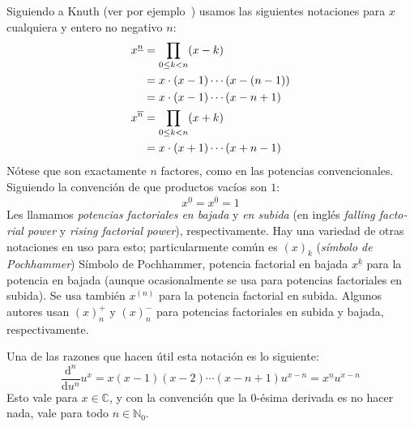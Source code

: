   Siguiendo a Knuth%
  (ver por ejemplo~\cite{graham94:_concr_mathem})
  usamos las siguientes notaciones para \(x\) cualquiera
  y entero no negativo \(n\):
  \begin{align}
    \label{eq:def-factorial-desciende}
    x^{\underline{n}}
      &= \prod_{0 \le k < n} (x - k) \\
      &= x \cdot (x - 1) \dotsm (x - (n - 1)) \notag \\
      &= x \cdot (x - 1) \dotsm (x - n + 1) \notag \\
    \label{eq:def-factorial-asciende}
    x^{\overline{n}}
      &= \prod_{0 \le k < n} (x + k) \\
      &= x \cdot (x + 1) \dotsm (x + n - 1) \notag
  \end{align}
  Nótese que
  son exactamente \(n\) factores,
  como en las potencias convencionales.
  Siguiendo la convención de que productos vacíos son \(1\):
  \begin{equation}
    \label{eq:potencias-factoriales-0}
    x^{\underline{0}} = x^{\overline{0}} = 1
  \end{equation}
  Les llamamos \emph{potencias factoriales en bajada}
  y \emph{en subida}
  (en inglés
    \emph{\foreignlanguage{english}{falling factorial power}}
   y \emph{\foreignlanguage{english}{rising factorial power}}),
  respectivamente.
  Hay una variedad de otras notaciones en uso para esto;
  particularmente común es \((x)_k\)
  (\emph{símbolo de Pochhammer})%
	     {Símbolo de Pochhammer,
	      potencia factorial en bajada \(x^{\underline{k}}\)}
  para la potencia en bajada
  (aunque ocasionalmente
   se usa para potencias factoriales en subida).
  Se usa también \(x^{(n)}\) para la potencia factorial en subida.
  Algunos autores usan \((x)^+_n\) y \((x)^-_n\)
  para potencias factoriales en subida y bajada,
  respectivamente.

  Una de las razones que hacen útil esta notación es lo siguiente:
  \begin{equation*}
    \frac{\mathrm{d}^n}{\mathrm{d} u^n} u^x
      = x (x - 1) (x - 2) \dotsm (x - n + 1) u^{x - n}
      = x^{\underline{n}} u^{x - n}
  \end{equation*}
  Esto vale para \(x \in \mathbb{C}\),
  y con la convención
  que la \(0\)\nobreakdash-ésima derivada es no hacer nada,
  vale para todo \(n \in \mathbb{N}_0\).

